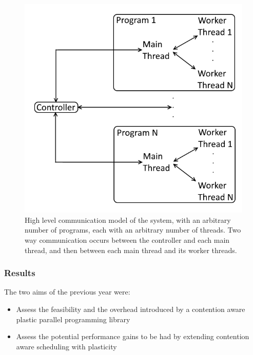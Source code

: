 \begin{itemize}
        \begin{figure}[H]
            \includegraphics[width=1\textwidth]{graphics/communication_structure.png}
            \caption{High level communication model of the system, with an arbitrary number of programs, each with an arbitrary number of threads. Two way communication occurs between the controller and each main thread, and then between each main thread and its worker threads.}
            \label{fig:old_communication_structure}
        \end{figure}
\end{itemize}



\subsubsection{Results}
\label{section:background:results}

The two aims of the previous year were:

\begin{itemize}
    \item Assess the feasibility and the overhead introduced by a contention aware plastic parallel programming library
    
    \item Assess the potential performance gains to be had by extending contention aware scheduling with plasticity
\end{itemize}

